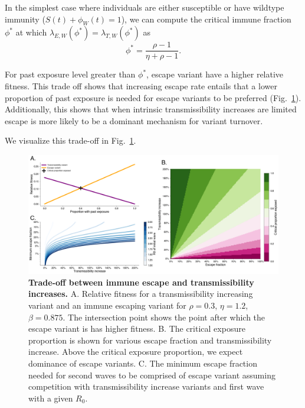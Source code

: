 \documentclass[12pt,oneside,letterpaper]{article}
\newcommand{\wt}{W}
\newcommand{\varE}{E}
\newcommand{\varT}{T}
\newcommand{\varEscape}{\eta}
\newcommand{\varTransmission}{\rho}
\begin{document}
In the simplest case where individuals are either susceptible or have wildtype immunity ($S(t) + \phi_{\wt}(t) = 1$), we can compute the critical immune fraction $\phi^{*}$ at which $\lambda_{\varE, \wt}(\phi^{*}) = \lambda_{\varT, \wt}(\phi^{*})$ as
\begin{equation} \label{eq:critical_immunity}
    \phi^{*} = \frac{\varTransmission - 1}{\varEscape + \varTransmission - 1}.
\end{equation}

For past exposure level greater than $\phi^{*}$, escape variant have a higher relative fitness.
This trade off shows that increasing escape rate entails that a lower proportion of past exposure is needed for escape variants to be preferred (Fig.~\ref{fig:transmission_tradeoff}).
Additionally, this shows that when intrinsic transmissibility increases are limited escape is more likely to be a dominant mechanism for variant turnover.

We visualize this trade-off in Fig.~\ref{fig:transmission_tradeoff}.

\begin{figure}[h]
    \centering
    \includegraphics[width=0.8\linewidth]{./figures/transmission_tradeoff.png}
    \caption{\textbf{Trade-off between immune escape and transmissibility increases.}
    A. Relative fitness for a transmissibility increasing variant and an immune escaping variant for $\varTransmission=0.3$, $\varEscape=1.2$, $\beta=0.875$.
    The intersection point shows the point after which the escape variant is has higher fitness.
    B. The critical exposure proportion is shown for various escape fraction and transmissibility increase. Above the critical exposure proportion, we expect dominance of escape variants.
    C. The minimum escape fraction needed for second waves to be comprised of escape variant assuming competition with transmissibility increase variants and first wave with a given $R_{0}$.}
    \label{fig:transmission_tradeoff}
\end{figure}
\end{document}
